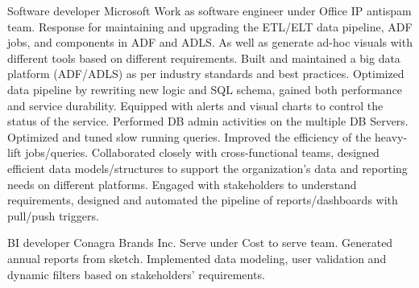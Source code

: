 \documentclass[a4paper]{ReadableCV}
\begin{document}
{}
        {Software developer}
        {Microsoft}
        {Work as software engineer under Office IP antispam team. Response for maintaining and upgrading the ETL/ELT data pipeline, ADF jobs, and components in ADF and ADLS. As well as generate ad-hoc visuals with different tools based on different requirements. }
{Built and maintained a big data platform (ADF/ADLS) as per industry standards and best practices.}
{Optimized data pipeline by rewriting new logic and SQL schema, gained both performance and service durability. Equipped with alerts and visual charts to control the status of the service.}
{Performed DB admin activities on the multiple DB Servers. Optimized and tuned slow running queries. Improved the efficiency of the heavy-lift jobs/queries.}
{Collaborated closely with cross-functional teams, designed efficient data models/structures to support the organization’s data and reporting needs on different platforms.}
{Engaged with stakeholders to understand requirements, designed and automated the pipeline of reports/dashboards with pull/push triggers.}

{BI developer}
{Conagra Brands Inc.}
{Serve under Cost to serve team. Generated annual reports from sketch.  Implemented data modeling, user validation and dynamic filters based on stakeholders' requirements.}
\end{document}
